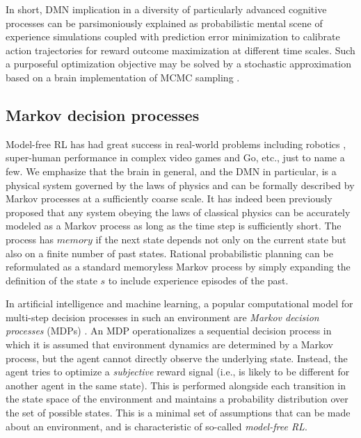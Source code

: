 \documentclass[10pt,letterpaper]{article}
\begin{document}
In short, DMN implication in a diversity of
particularly advanced cognitive processes
can be parsimoniously explained as probabilistic mental
scene of experience simulations coupled with prediction error minimization
to calibrate action trajectories for
reward outcome maximization at different time scales.
Such a purposeful optimization objective
may be solved by a stochastic approximation
based on a brain implementation of MCMC sampling
\citep{tenenbaum2011grow}.



\subsection{Markov decision processes}
Model-free RL has had great success in real-world problems including robotics
\citep{ng2004,abbeel2004},
super-human performance in complex video games \citep{mnih2015} and Go\citep{silver2016mastering}, etc., just to name a few.
We emphasize that the brain in general, and the DMN in particular,
is a physical system governed by the laws of
physics and can be formally described
by Markov processes at a sufficiently coarse scale.
It has indeed been previously proposed \citep{tegmark2016improved} that
any system obeying the laws of classical physics can be accurately modeled as a Markov process as long as the time
step is sufficiently short.
The process has $memory$ if the next state depends not only on the current state
but also on a finite number of past states.
Rational probabilistic planning can be reformulated
as a standard memoryless Markov process by simply expanding the
definition of the state $s$ to include experience episodes of the past.


In artificial intelligence and machine learning, a popular computational model for
multi-step decision processes in such an environment are
\textit{Markov decision processes} (MDPs) \citep{sutton1998reinforcement}.
An MDP operationalizes a sequential decision process
in which it is assumed that environment dynamics are determined by a Markov process,
but the agent cannot directly observe the underlying state.
Instead, the agent tries to optimize a \textit{subjective} reward
signal (i.e., is likely to be different for another agent in the same state).
This is performed alongside each transition in the state space of the environment
 and maintains a probability distribution over the set of possible
states.
This is a minimal set of assumptions that can be made about an environment,
and is characteristic of so-called \textit{model-free RL}.
\end{document}

